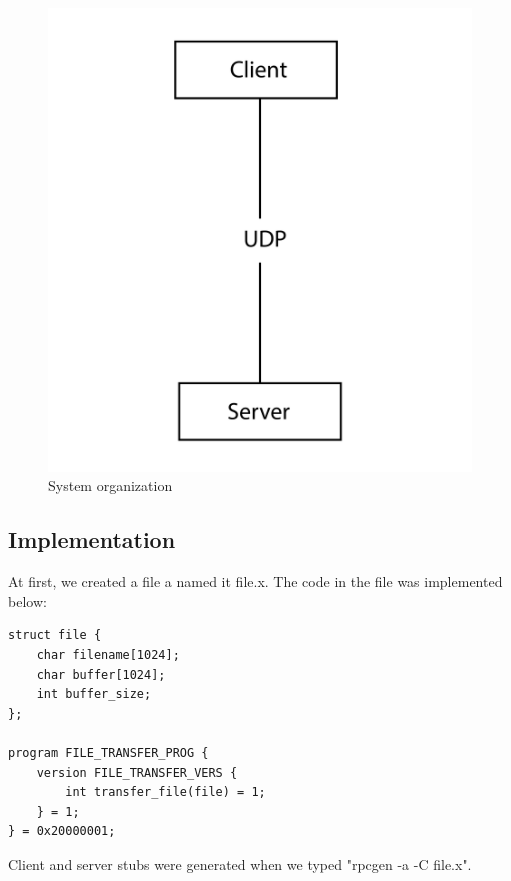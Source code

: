 \documentclass[13pt]{article}
\begin{document}
\begin{figure}[H]
    \centering
    \includegraphics[scale=0.25]{system-01.png}
    \caption{System organization}
\end{figure}

\subsection{Implementation}
\noindent%
At first, we created a file a named it file.x. The code in the file was implemented below:

\begin{verbatim}
struct file {
	char filename[1024];
	char buffer[1024];
	int buffer_size;
};

program FILE_TRANSFER_PROG {
	version FILE_TRANSFER_VERS {
		int transfer_file(file) = 1;
	} = 1;
} = 0x20000001;
\end{verbatim}

\noindent%
Client and server stubs were generated when we typed "rpcgen -a -C file.x". \\
\end{document}
